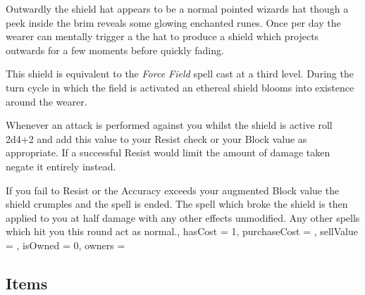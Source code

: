 \documentclass[9pt,twocolumn]{article}
\begin{document}
{{Outwardly\comma{} the shield hat appears to be a normal pointed wizard\apos{}s hat\comma{} though a peek inside the brim reveals some glowing enchanted runes. Once per day\comma{} the wearer can mentally trigger a the hat to produce a shield which projects outwards for a few moments\comma{} before quickly fading. 

This shield is equivalent to the {\it Force Field} spell cast at a third level. During the turn cycle in which the field is activated\comma{} an ethereal shield blooms into existence around the wearer.

Whenever an attack is performed against you whilst the shield is active\comma{} roll 2d4+2 and add this value to your Resist check or your Block value\comma{} as appropriate. If a successful Resist would limit the amount of damage taken\comma{} negate it entirely instead. 

If you fail to Resist\comma{} or the Accuracy exceeds your augmented Block value\comma{} the shield crumples and the spell is ended. The spell which broke the shield is then applied to you at half damage\comma{} with any other effects unmodified. Any other spells which hit you this round act as normal., 
	hasCost = 1, 
	purchaseCost = , 
	sellValue = , 
	isOwned = 0, 
	owners = 
}

 \subsection{Items}




}
\end{document}
